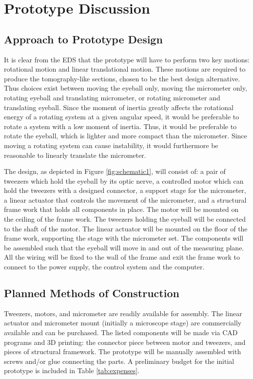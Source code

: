 \documentclass{article}
\begin{document}
\section{Prototype Discussion}
\subsection{Approach to Prototype Design}
It is clear from the EDS that the prototype will have to perform two key motions: rotational motion and linear translational motion. These motions are required to produce the tomography-like sections, chosen to be the best design alternative. Thus choices exist between moving the eyeball only, moving the micrometer only, rotating eyeball and translating micrometer, or rotating micrometer and translating eyeball. Since the moment of inertia greatly affects the rotational energy of a rotating system at a given angular speed, it would be preferable to rotate a system with a low moment of inertia. Thus, it would be preferable to rotate the eyeball, which is lighter and more compact than the micrometer. Since moving a rotating system can cause instability, it would furthermore be reasonable to linearly translate the micrometer. 

The design, as depicted in Figure \ref{fig:schematic1}, will consist of: a pair of tweezers which hold the eyeball by its optic nerve, a controlled motor which can hold the tweezers with a designed connector, a support stage for the micrometer, a linear actuator that controls the movement of the micrometer, and a structural frame work that holds all components in place. The motor will be mounted on the ceiling of the frame work. The tweezers holding the eyeball will be connected to the shaft of the motor. The linear actuator will be mounted on the floor of the frame work, supporting the stage with the micrometer set. The components will be assembled such that the eyeball will move in and out of the measuring plane. All the wiring will be fixed to the wall of the frame and exit the frame work to connect to the power supply, the control system and the computer.

\subsection{Planned Methods of Construction}
Tweezers, motors, and micrometer are readily available for assembly. The linear actuator and micrometer mount (initially a microscope stage) are commercially available and can be purchased. The listed components will be made via CAD programs and 3D printing: the connector piece between motor and tweezers, and pieces of structural framework. The prototype will be manually assembled with screws and/or glue connecting the parts. A preliminary budget for the initial prototype is included in Table \ref{tab:expenses}.
\end{document}
